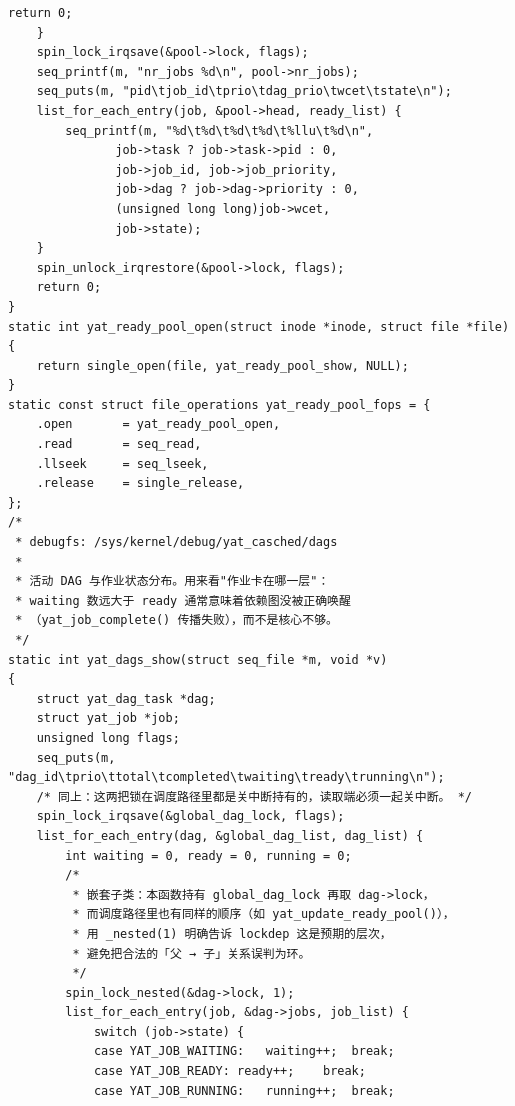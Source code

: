 \documentclass[10pt,a4paper]{article}
\newenvironment{yatpage}{\vspace*{0pt}}{\par}
\begin{document}
\newpage
\begin{yatpage}
\begin{Verbatim}[fontsize=\fontsize{8.2}{9.8}\selectfont]
		return 0;
	}
	spin_lock_irqsave(&pool->lock, flags);
	seq_printf(m, "nr_jobs %d\n", pool->nr_jobs);
	seq_puts(m, "pid\tjob_id\tprio\tdag_prio\twcet\tstate\n");
	list_for_each_entry(job, &pool->head, ready_list) {
		seq_printf(m, "%d\t%d\t%d\t%d\t%llu\t%d\n",
			   job->task ? job->task->pid : 0,
			   job->job_id, job->job_priority,
			   job->dag ? job->dag->priority : 0,
			   (unsigned long long)job->wcet,
			   job->state);
	}
	spin_unlock_irqrestore(&pool->lock, flags);
	return 0;
}
static int yat_ready_pool_open(struct inode *inode, struct file *file)
{
	return single_open(file, yat_ready_pool_show, NULL);
}
static const struct file_operations yat_ready_pool_fops = {
	.open		= yat_ready_pool_open,
	.read		= seq_read,
	.llseek		= seq_lseek,
	.release	= single_release,
};
/*
 * debugfs: /sys/kernel/debug/yat_casched/dags
 *
 * 活动 DAG 与作业状态分布。用来看"作业卡在哪一层"：
 * waiting 数远大于 ready 通常意味着依赖图没被正确唤醒
 * （yat_job_complete() 传播失败），而不是核心不够。
 */
static int yat_dags_show(struct seq_file *m, void *v)
{
	struct yat_dag_task *dag;
	struct yat_job *job;
	unsigned long flags;
	seq_puts(m, "dag_id\tprio\ttotal\tcompleted\twaiting\tready\trunning\n");
	/* 同上：这两把锁在调度路径里都是关中断持有的，读取端必须一起关中断。 */
	spin_lock_irqsave(&global_dag_lock, flags);
	list_for_each_entry(dag, &global_dag_list, dag_list) {
		int waiting = 0, ready = 0, running = 0;
		/*
		 * 嵌套子类：本函数持有 global_dag_lock 再取 dag->lock，
		 * 而调度路径里也有同样的顺序（如 yat_update_ready_pool()），
		 * 用 _nested(1) 明确告诉 lockdep 这是预期的层次，
		 * 避免把合法的「父 → 子」关系误判为环。
		 */
		spin_lock_nested(&dag->lock, 1);
		list_for_each_entry(job, &dag->jobs, job_list) {
			switch (job->state) {
			case YAT_JOB_WAITING:	waiting++;	break;
			case YAT_JOB_READY:	ready++;	break;
			case YAT_JOB_RUNNING:	running++;	break;
\end{Verbatim}
\end{yatpage}
\newpage
\end{document}
